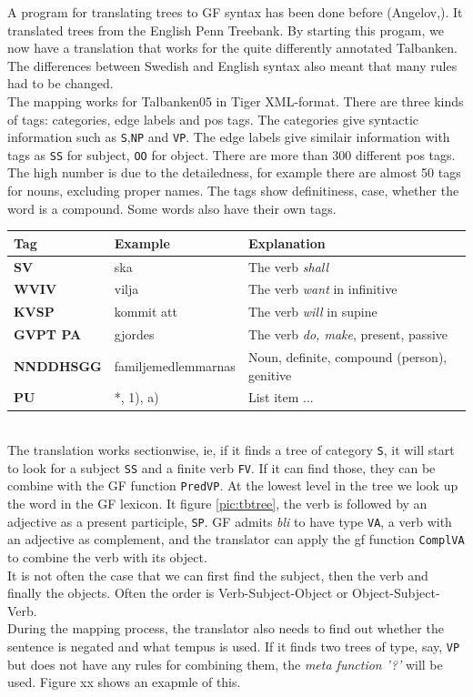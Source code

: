 \documentclass{report}
\begin{document}
A program for translating trees to GF syntax has been done before (Angelov,).
It translated trees from the English Penn Treebank. By starting this progam, we now have
a translation that works for the quite differently annotated Talbanken. The differences between
Swedish and English syntax also meant that many rules had to be changed.\\

The mapping works for Talbanken05 in Tiger XML-format. There are three kinds of
tags: categories, edge labels and pos tags. 
The categories give syntactic information such as \verb|S|,\verb|NP| and \verb|VP|.
The edge labels give similair information with tags as \verb|SS| for subject, 
\verb|OO| for object. There are more than 300 different pos tags. The high
number is due to the detailedness, for example there are almost 50 tags for
nouns, excluding proper names. The tags show definitiness, case, whether the
word is a compound. Some words also have their own tags.\\

\begin{tabular}{lll}
\textbf{Tag} & \textbf{Example} & \textbf{Explanation} \\
\hline
\textbf{SV} & ska & The verb \emph{shall}\\
\textbf{WVIV} & vilja & The verb \emph{want} in infinitive\\
\textbf{KVSP} & kommit att & The verb \emph{will} in supine\\
\textbf{GVPT  PA} & gjordes & The verb \emph{do, make}, present, passive \\
\textbf{NNDDHSGG} & familjemedlemmarnas & Noun, definite, compound (person), genitive \\
\textbf{PU} & *, 1), a) & List item  ...\\
\end{tabular}\\


The translation works sectionwise, ie, if it finds a tree of category \verb|S|,
it will start to look for a subject \verb|SS| and a finite verb \verb|FV|. If it
can find those, they can be combine with the GF function \verb|PredVP|.
At the lowest level in the tree we look up the word in the GF lexicon.
It figure \ref{pic:tbtree}, the verb is followed by an adjective as a present
participle, \verb|SP|. GF admits \emph{bli} to have type \verb|VA|, a verb
with an adjective as complement, and the translator can apply the gf function
\verb|ComplVA| to combine the verb with its object. \\
It is not often the case that we can first find the subject, then the verb and 
finally the objects. Often the order is Verb-Subject-Object or Object-Subject-Verb. \\
During the mapping process, the translator also needs to find out whether the sentence is
negated and what tempus is used. If it finds two trees of type, say, \verb|VP| but does not
have any rules for combining them, the \textit{meta function} \emph{'?'} will be used. 
Figure xx shows an exapmle of this.\\
\end{document}
